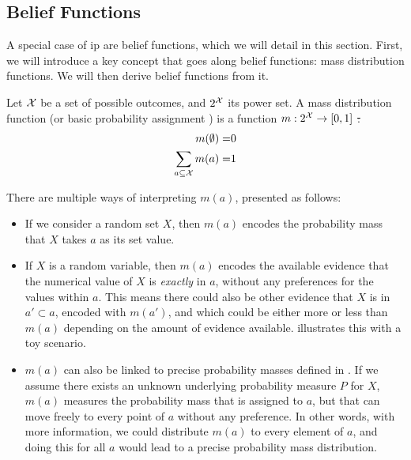 \subsection{Belief Functions}\label{sec:belief_functions}
A special case of \acrshort{ip} are belief functions, which we will detail in this section. First, we will introduce a key concept that goes along belief functions: mass distribution functions. We will then derive belief functions from it.

\begin{definition}\label{def:mass_distribution_function}
    Let $\mathcal{X}$ be a set of possible outcomes, and $2^{\mathcal{X}}$ its power set. A mass distribution function (or basic probability assignment \cite{shafer_mathematical_1976}) is a function $m:2^{\mathcal{X}}\rightarrow[0,1]$ \st:
    \begin{align}
        m(\emptyset) =& 0\label{eq:mass_emptyset}\\
        \sum_{a\subseteq\mathcal{X}}m(a) =& 1\label{eq:mass_whole_set}
    \end{align}
\end{definition}

There are multiple ways of interpreting $m(a)$, presented as follows:
\begin{itemize}
    \item If we consider a random set $X$, then $m(a)$ encodes the probability mass that $X$ takes $a$ as its set value.
    \item If $X$ is a random variable, then $m(a)$ encodes the available evidence that the numerical value of $X$ is \textit{exactly} in $a$, without any preferences for the values within $a$. This means there could also be other evidence that $X$ is in $a'\subset a$, encoded with $m(a')$, and which could be either more or less than $m(a)$ depending on the amount of evidence available.  illustrates this with a toy scenario. 
    \item $m(a)$ can also be linked to precise probability masses defined in . If we assume there exists an unknown underlying probability measure $P$ for $X$, $m(a)$ measures the probability mass that is assigned to $a$, but that can move freely to every point of $a$ without any preference. In other words, with more information, we could distribute $m(a)$ to every element of $a$, and doing this for all $a$ would lead to a precise probability mass distribution.
\end{itemize}

